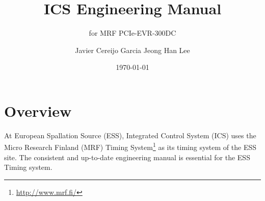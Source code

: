 \documentclass[11pt
  , a4paper
  , article
  , oneside
  , showtrims
]{memoir}
\begin{document}


\date{\today}




\title{ICS Engineering Manual}
\subtitle{for MRF PCIe-EVR-300DC}
\author{Javier Cereijo Garcia \newline Jeong Han Lee }



\showtrimson

\esstitle
\newpage
\tableofcontents
\newpage



\chapter{Overview}
At European Spallation Source (ESS), Integrated Control System (ICS) uses the Micro Research Finland (MRF) Timing System{\footnote{\url{http://www.mrf.fi/}}} as its timing system of the ESS site. The consistent and up-to-date engineering manual is essential for the ESS Timing system.
\end{document}
